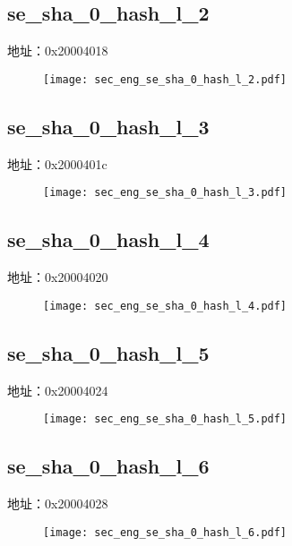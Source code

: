 \subsection{se\_sha\_0\_hash\_l\_2}
\label{sec_eng-se-sha-0-hash-l-2}
地址：0x20004018
 \begin{figure}[H]
\texttt{[image: sec\_eng\_se\_sha\_0\_hash\_l\_2.pdf]}
\end{figure}

\subsection{se\_sha\_0\_hash\_l\_3}
\label{sec_eng-se-sha-0-hash-l-3}
地址：0x2000401c
 \begin{figure}[H]
\texttt{[image: sec\_eng\_se\_sha\_0\_hash\_l\_3.pdf]}
\end{figure}

\subsection{se\_sha\_0\_hash\_l\_4}
\label{sec_eng-se-sha-0-hash-l-4}
地址：0x20004020
 \begin{figure}[H]
\texttt{[image: sec\_eng\_se\_sha\_0\_hash\_l\_4.pdf]}
\end{figure}

\subsection{se\_sha\_0\_hash\_l\_5}
\label{sec_eng-se-sha-0-hash-l-5}
地址：0x20004024
 \begin{figure}[H]
\texttt{[image: sec\_eng\_se\_sha\_0\_hash\_l\_5.pdf]}
\end{figure}

\subsection{se\_sha\_0\_hash\_l\_6}
\label{sec_eng-se-sha-0-hash-l-6}
地址：0x20004028
 \begin{figure}[H]
\texttt{[image: sec\_eng\_se\_sha\_0\_hash\_l\_6.pdf]}
\end{figure}


